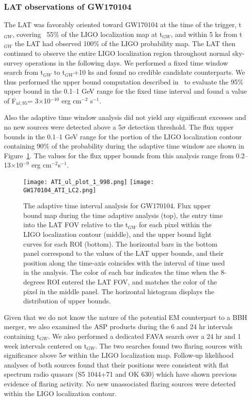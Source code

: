 \documentclass{aastex61}
\begin{document}
\subsubsection{LAT observations of GW170104}
The LAT was favorably oriented toward GW170104 at the time of the trigger, t$_{GW}$, covering ~55\% of the LIGO localization map at t$_{GW}$, and within 5 ks from t$_{GW}$ the LAT had observed 100\% of the LIGO probability map. The LAT then continued to observe the entire LIGO localization region throughout normal sky-survey operations in the following days. We performed a fixed time window search from t$_{GW}$ to t$_{GW}$+10 ks and found no credible candidate counterparts. We thus performed the upper bound computation described in~\citet{Vianello17} to evaluate the 95\% upper bound in the 0.1--1 GeV range for the fixed time interval and found a value of F$_{ul,95}$= 3$\times$10$^{-10}$ erg cm$^{-2}$ s$^{-1}$.

Also the adaptive time window analysis did not yield any significant excesses and no new sources were detected above a 5$\sigma$ detection threshold. The flux upper bounds in the 0.1--1 GeV range for the portion of the LIGO localization contour containing 90\% of the probability during the adaptive time window are shown in Figure~\ref{LATUpperLimitsAdaptive}. The values for the flux upper bounds from this analysis range from 0.2--13$\times$10$^{-9}$ erg cm$^{-2}$s$^{-1}$.
\begin{figure}
	\begin{center}
     \texttt{[image: ATI\_ul\_plot\_1\_998.png]}	
	 \texttt{[image: GW170104\_ATI\_LC2.png]}
	\end{center}
\caption{The adaptive time interval analysis for GW170104. Flux upper bound map during the time adaptive analysis (top), the entry time into the LAT FOV relative to the t$_{GW}$ for each pixel within the LIGO localization contour (middle), and the upper bound light curves for each ROI (bottom). The horizontal bars in the bottom panel correspond to the values of the LAT upper bounds, and their position along the time-axis coincides with the interval of time used in the analysis. The color of each bar indicates the time when the 8-degrees ROI entered the LAT FOV, and matches the color of the pixel in the middle panel. The horizontal histogram displays the distribution of upper bounds.}
\label{LATUpperLimitsAdaptive}
\end{figure}

Given that we do not know the nature of the potential EM counterpart to a BBH merger, we also examined the ASP products during the 6 and 24 hr intervals containing t$_{GW}$. We also performed a dedicated FAVA search over a 24 hr and 1 week intervals centered on t$_{GW}$. The two searches found two flaring sources with significance above 5$\sigma$ within the LIGO localization map.  Follow-up likelihood analyses of both sources found that their positions were consistent with flat spectrum radio quasars (S5 1044+71 and OK 630) which have shown previous evidence of flaring activity. No new unassociated flaring sources were detected within the LIGO localization contour.
\end{document}
